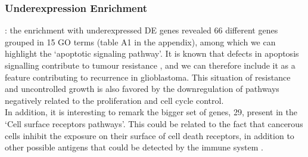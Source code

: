 \documentclass[9pt,twocolumn,twoside]{gsajnl}
\begin{document}
\subsubsection*{Underexpression Enrichment}: the enrichment with underexpressed DE genes revealed 66 different genes grouped in 15 GO terms (table A1 in the appendix), among which we can highlight the `apoptotic signaling pathway'. It is known that defects in apoptosis signalling contribute to tumour resistance \citep{Debatin2004}, and we can therefore include it as a feature contributing to recurrence in glioblastoma. This situation of resistance and uncontrolled growth is also favored by the downregulation of pathways negatively related to the proliferation and cell cycle control.\\
In addition, it is interesting to remark the bigger set of genes, 29, present in the `Cell surface receptors pathways'. This could be related to the fact that cancerous cells inhibit the exposure on their surface of cell death receptors, in addition to other possible antigens that could be detected by the immune system \citep{Ozoren2003}.
\end{document}
